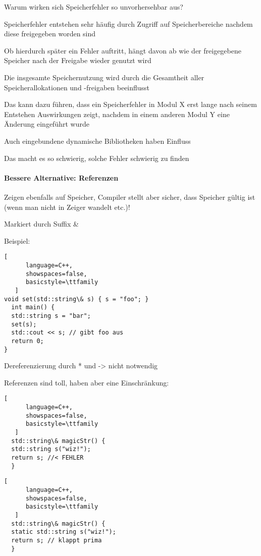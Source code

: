 \documentclass[10pt]{article}
\begin{document}
\begin{itemize*}
Warum wirken sich Speicherfehler so unvorhersehbar aus?
\begin{itemize*}
  \item Speicherfehler entstehen sehr häufig durch Zugriff auf Speicherbereiche nachdem diese freigegeben worden sind
  \item Ob hierdurch später ein Fehler auftritt, hängt davon ab wie der freigegebene Speicher nach der Freigabe wieder genutzt wird
  \item Die insgesamte Speichernutzung wird durch die Gesamtheit aller Speicherallokationen und -freigaben beeinflusst
  \item Das kann dazu führen, dass ein Speicherfehler in Modul X erst lange nach seinem Entstehen Auswirkungen zeigt, nachdem in einem anderen Modul Y eine Änderung eingeführt wurde
  \item Auch eingebundene dynamische Bibliotheken haben Einfluss
  \item Das macht es so schwierig, solche Fehler schwierig zu finden
\end{itemize*}

\paragraph{Bessere Alternative: Referenzen}
\begin{itemize*}
  \item Zeigen ebenfalls auf Speicher, Compiler stellt aber sicher, dass Speicher gültig ist (wenn man nicht in Zeiger wandelt etc.)!
  \item Markiert durch Suffix \&
  \item Beispiel:
  \begin{lstlisting}[
      language=C++,
      showspaces=false,
      basicstyle=\ttfamily
   ]
void set(std::string\& s) { s = "foo"; }
  int main() {
  std::string s = "bar";
  set(s);
  std::cout << s; // gibt foo aus
  return 0;
}
\end{lstlisting}
  
  \item Dereferenzierung durch * und -> nicht notwendig
  \item Referenzen sind toll, haben aber eine Einschränkung:
  \begin{lstlisting}[
      language=C++,
      showspaces=false,
      basicstyle=\ttfamily
   ]
  std::string\& magicStr() {
  std::string s("wiz!");
  return s; //< FEHLER
  }
\end{lstlisting}
  
  \begin{lstlisting}[
      language=C++,
      showspaces=false,
      basicstyle=\ttfamily
   ]
  std::string\& magicStr() {
  static std::string s("wiz!");
  return s; // klappt prima
  }
\end{lstlisting}
  

\end{itemize*}
\end{itemize*}
\end{document}
